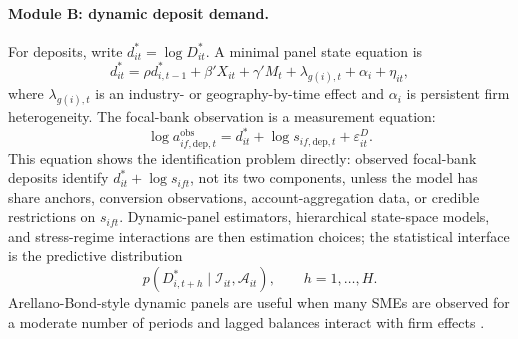\documentclass[11pt]{article}
\begin{document}
\paragraph{Module B: dynamic deposit demand.}
For deposits, write $d_{it}^{*}=\log D_{it}^{*}$. A minimal panel state equation
is
\[
  d_{it}^{*}
  =
  \rho d_{i,t-1}^{*}
  +\beta'X_{it}
  +\gamma'M_t
  +\lambda_{g(i),t}
  +\alpha_i
  +\eta_{it},
\]
where $\lambda_{g(i),t}$ is an industry- or geography-by-time effect and
$\alpha_i$ is persistent firm heterogeneity. The focal-bank observation is a
measurement equation:
\[
  \log a_{if,\mathrm{dep},t}^{\mathrm{obs}}
  =
  d_{it}^{*}
  +\log s_{if,\mathrm{dep},t}
  +\varepsilon_{it}^{D}.
\]
This equation shows the identification problem directly: observed focal-bank
deposits identify $d_{it}^{*}+\log s_{ift}$, not its two components, unless the
model has share anchors, conversion observations, account-aggregation data, or
credible restrictions on $s_{ift}$. Dynamic-panel estimators, hierarchical
state-space models, and stress-regime interactions are then estimation choices;
the statistical interface is the predictive distribution
\[
  p(D_{i,t+h}^{*}\mid \mathcal{I}_{it},\mathcal{A}_{it}),\qquad h=1,\ldots,H.
\]
Arellano-Bond-style dynamic panels are useful when many SMEs are observed for a
moderate number of periods and lagged balances interact with firm effects
\citep{arellano1991panel}.
\end{document}
